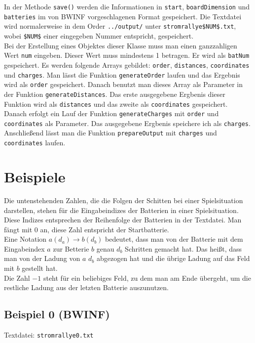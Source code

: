 \documentclass[a4paper,10pt,ngerman]{scrartcl}
\begin{document}
In der Methode \texttt{save()} werden die Informationen in \texttt{start}, \texttt{boardDimension} und \texttt{batteries}
im von BWINF vorgeschlagenen Format gespeichert. Die Textdatei wird normalerweise in dem Order \texttt{../output/}
unter \texttt{stromrallye\$NUM\$.txt}, wobei \texttt{\$NUM\$} einer eingegeben Nummer entspricht, gespeichert.\\

Bei der Erstellung eines Objektes dieser Klasse muss man einen ganzzahligen Wert \texttt{num} eingeben.
Dieser Wert muss mindestens 1 betragen. Er wird als \texttt{batNum} gespeichert.
Es werden folgende Arrays gebildet: \texttt{order}, \texttt{distances}, \texttt{coordinates} und \texttt{charges}.
Man lässt die Funktion \texttt{generateOrder} laufen und das Ergebnis wird als \texttt{order} gespeichert.
Danach benutzt man dieses Array als Parameter in der Funktion \texttt{generateDistances}.
Das erste ausgegebene Ergbenis dieser Funktion wird als \texttt{distances} und das zweite als \texttt{coordinates} gespeichert.
Danach erfolgt ein Lauf der Funktion \texttt{generateCharges} mit \texttt{order} und \texttt{coordinates} als Parameter.
Das ausgegebene Ergbenis speichere ich als \texttt{charges}.
Anschließend lässt man die Funktion \texttt{prepareOutput} mit \texttt{charges} und \texttt{coordinates} laufen.

\newpage
\section{Beispiele}
Die untenstehenden Zahlen, die die Folgen der Schitten bei einer Spielsituation darstellen, stehen für die Eingabeindizes
der Batterien in einer Spielsituation. Diese Indizes entsprechen der Reihenfolge der Batterien in der Textdatei. Man fängt mit 0 an,
diese Zahl entspricht der Startbatterie.\\
Eine Notation $a(d_a) \rightarrow b(d_b)$ bedeutet, dass man von der Batterie mit dem Eingabeindex $a$ zur Betterie $b$ genau $d_b$ Schritten
gemacht hat. Das heißt, dass man von der Ladung von $a$ $d_b$ abgezogen hat und die übrige Ladung auf das Feld mit $b$ gestellt hat.\\
Die Zahl $-1$ steht für ein beliebiges Feld, zu dem man am Ende übergeht, um die restliche Ladung aus der letzten Batterie auszunutzen.

\subsection{Beispiel 0 (BWINF)}\label{example:0}
Textdatei: \texttt{stromrallye0.txt}\\
\end{document}
